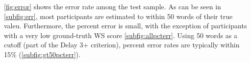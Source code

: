 \documentclass[letterpaper]{article}
\begin{document}
    \autoref{fig:error} shows the error rate among the test sample. As can be
    seen in \autoref{subfig:err}, most participants are estimated to within
    50 words of their true valeu. Furthermore, the percent error is small, with
    the exception of participants with a very low ground-truth WS score
    \autoref{subfig:allpcterr}.
    Using 50 words as a cutoff (part of the Delay 3+ criterion), percent error
    rates are typically within 15\% (\autoref{subfig:gt50pcterr}).
\end{document}

